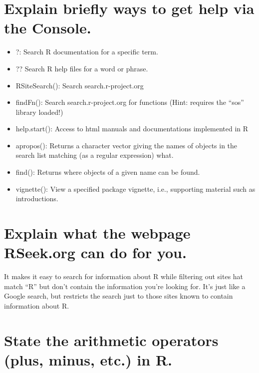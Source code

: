 \documentclass[
]{article}
\providecommand{\tightlist}{%
  \setlength{\itemsep}{0pt}\setlength{\parskip}{0pt}}
\begin{document}
\hypertarget{explain-briefly-ways-to-get-help-via-the-console.}{%
\section{Explain briefly ways to get help via the
Console.}\label{explain-briefly-ways-to-get-help-via-the-console.}}

\begin{itemize}
\tightlist
\item
  ?: Search R documentation for a specific term.
\item
  ?? Search R help files for a word or phrase.
\item
  RSiteSearch(): Search search.r-project.org
\item
  findFn(): Search search.r-project.org for functions (Hint: requires
  the ``sos'' library loaded!)
\item
  help.start(): Access to html manuals and documentations implemented in
  R
\item
  apropos(): Returns a character vector giving the names of objects in
  the search list matching (as a regular expression) what.
\item
  find(): Returns where objects of a given name can be found.
\item
  vignette(): View a specified package vignette, i.e., supporting
  material such as introductions.
\end{itemize}

\hypertarget{explain-what-the-webpage-rseek.org-can-do-for-you.}{%
\section{Explain what the webpage RSeek.org can do for
you.}\label{explain-what-the-webpage-rseek.org-can-do-for-you.}}

It makes it easy to search for information about R while filtering out
sites hat match ``R'' but don't contain the information you're looking
for. It's just like a Google search, but restricts the search just to
those sites known to contain information about R.

\hypertarget{state-the-arithmetic-operators-plus-minus-etc.-in-r.}{%
\section{State the arithmetic operators (plus, minus, etc.) in
R.}\label{state-the-arithmetic-operators-plus-minus-etc.-in-r.}}
\end{document}
